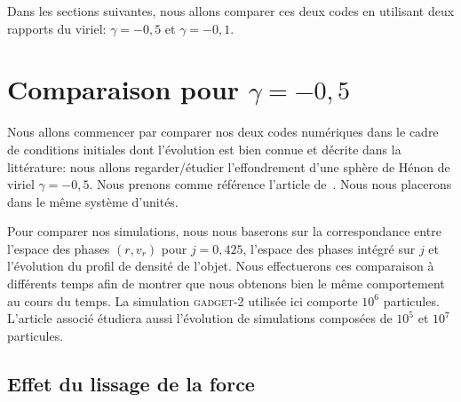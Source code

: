 		Dans les sections suivantes, nous allons comparer ces deux codes en utilisant deux rapports du viriel: $\gamma=-0,5$ et $\gamma=-0,1$.

	\section{Comparaison pour $\gamma = -0,5$}

		Nous allons commencer par comparer nos deux codes numériques dans le cadre de conditions initiales dont l'évolution est bien connue et
		décrite dans la littérature: nous allons regarder/étudier l'effondrement d'une sphère de Hénon de viriel $\gamma=-0,5$. Nous prenons comme
		référence l'article de~\cite{1983PASJ...35..547F}. Nous nous placerons dans le même système d'unités.

		Pour comparer nos simulations, nous nous baserons sur la correspondance entre l'espace des phases $(r, v_r)$ pour $j=0,425$, l'espace
		des phases intégré sur $j$ et l'évolution du profil de densité de l'objet. Nous effectuerons ces comparaison à différents temps afin
		de montrer que nous obtenons bien le même comportement au cours du temps. La simulation \textsc{gadget-2} utilisée ici comporte $10^6$
		particules. L'article associé étudiera aussi l'évolution de simulations composées de $10^5$ et $10^7$ particules.


		\subsection{Effet du lissage de la force}

